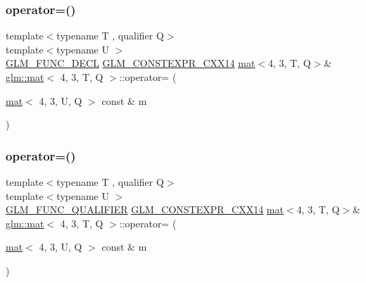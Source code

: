 \mbox{\label{structglm_1_1mat_3_014_00_013_00_01_t_00_01_q_01_4_a82d2202eb9fed8f650e228affae47ba7}} 
\subsubsection{\texorpdfstring{operator=()}{operator=()}\hspace{0.1cm}{\footnotesize\ttfamily [2/3]}}
{\footnotesize\ttfamily template$<$typename T , qualifier Q$>$ \\
template$<$typename U $>$ \\
\mbox{\hyperlink{setup_8hpp_ab2d052de21a70539923e9bcbf6e83a51}{G\+L\+M\+\_\+\+F\+U\+N\+C\+\_\+\+D\+E\+CL}} \mbox{\hyperlink{setup_8hpp_a4dd12abf5e1164bc57f3a34671d03844}{G\+L\+M\+\_\+\+C\+O\+N\+S\+T\+E\+X\+P\+R\+\_\+\+C\+X\+X14}} \mbox{\hyperlink{structglm_1_1mat}{mat}}$<$4, 3, T, Q$>$\& \mbox{\hyperlink{structglm_1_1mat}{glm\+::mat}}$<$ 4, 3, T, Q $>$\+::operator= (\begin{DoxyParamCaption}\item[{\mbox{\hyperlink{structglm_1_1mat}{mat}}$<$ 4, 3, U, Q $>$ const \&}]{m }\end{DoxyParamCaption})}

\mbox{\label{structglm_1_1mat_3_014_00_013_00_01_t_00_01_q_01_4_aa924cf798f7324b172ca31f969fd02e4}} 
\subsubsection{\texorpdfstring{operator=()}{operator=()}\hspace{0.1cm}{\footnotesize\ttfamily [3/3]}}
{\footnotesize\ttfamily template$<$typename T , qualifier Q$>$ \\
template$<$typename U $>$ \\
\mbox{\hyperlink{setup_8hpp_a33fdea6f91c5f834105f7415e2a64407}{G\+L\+M\+\_\+\+F\+U\+N\+C\+\_\+\+Q\+U\+A\+L\+I\+F\+I\+ER}} \mbox{\hyperlink{setup_8hpp_a4dd12abf5e1164bc57f3a34671d03844}{G\+L\+M\+\_\+\+C\+O\+N\+S\+T\+E\+X\+P\+R\+\_\+\+C\+X\+X14}} \mbox{\hyperlink{structglm_1_1mat}{mat}}$<$4, 3, T, Q$>$\& \mbox{\hyperlink{structglm_1_1mat}{glm\+::mat}}$<$ 4, 3, T, Q $>$\+::operator= (\begin{DoxyParamCaption}\item[{\mbox{\hyperlink{structglm_1_1mat}{mat}}$<$ 4, 3, U, Q $>$ const \&}]{m }\end{DoxyParamCaption})}



